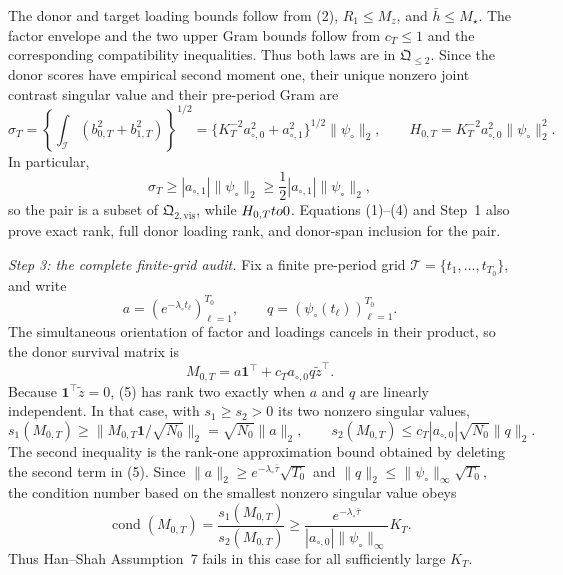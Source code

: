 The donor and target loading bounds follow from (2), \(R_1\le M_z\), and \(\bar h\le M_\star\).  The factor envelope and the two upper Gram bounds follow from \(c_T\le1\) and the corresponding compatibility inequalities.  Thus both laws are in \(\mathfrak Q_{\le2}\).  Since the donor scores have empirical second moment one, their unique nonzero joint contrast singular value and their pre-period Gram are
\[
 \sigma_T
 =\left\{\int_{\mathcal I}(b_{0,T}^2+b_{1,T}^2)\right\}^{1/2}
 =\{K_T^{-2}a_{\circ,0}^2+a_{\circ,1}^2\}^{1/2}\|\psi_\circ\|_2,
 \qquad
 H_{0,T}=K_T^{-2}a_{\circ,0}^2\|\psi_\circ\|_2^2.     \tag{3}
\]
In particular,
\[
 \sigma_T\ge |a_{\circ,1}|\|\psi_\circ\|_2
 \ge\frac12|a_{\circ,1}|\|\psi_\circ\|_2,            \tag{4}
\]
so the pair is a subset of \(\mathfrak Q_{2,\mathrm{vis}}\), while \(H_{0,T}\\to0\).  Equations (1)--(4) and Step~1 also prove exact rank, full donor loading rank, and donor-span inclusion for the pair.

\emph{Step 3: the complete finite-grid audit.}
Fix a finite pre-period grid \(\mathcal T=\{t_1,\ldots,t_{T_0}\}\), and write
\[
 a=(e^{-\lambda_\circ t_\ell})_{\ell=1}^{T_0},
 \qquad q=(\psi_\circ(t_\ell))_{\ell=1}^{T_0}.
\]
The simultaneous orientation of factor and loadings cancels in their product, so the donor survival matrix is
\[
 M_{0,T}=a\mathbf1^\top+c_Ta_{\circ,0}q\widetilde z^\top. \tag{5}
\]
Because \(\mathbf1^\top\widetilde z=0\), (5) has rank two exactly when \(a\) and \(q\) are linearly independent.  In that case, with \(s_1\ge s_2>0\) its two nonzero singular values,
\[
 s_1(M_{0,T})
 \ge\|M_{0,T}\mathbf1/\sqrt{N_0}\|_2
 =\sqrt{N_0}\|a\|_2,
 \qquad
 s_2(M_{0,T})
 \le c_T|a_{\circ,0}|\sqrt{N_0}\|q\|_2.              \tag{6}
\]
The second inequality is the rank-one approximation bound obtained by deleting the second term in (5).  Since
\(
 \|a\|_2\ge e^{-\lambda_\circ\bar\tau}\sqrt{T_0}
\)
and
\(
 \|q\|_2\le\|\psi_\circ\|_\infty\sqrt{T_0},
\)
the condition number based on the smallest nonzero singular value obeys
\[
 \operatorname{cond}(M_{0,T})
 =\frac{s_1(M_{0,T})}{s_2(M_{0,T})}
 \ge
 \frac{e^{-\lambda_\circ\bar\tau}}
 {|a_{\circ,0}|\|\psi_\circ\|_\infty}K_T.             \tag{7}
\]
Thus Han--Shah Assumption~7 fails in this case for all sufficiently large \(K_T\).

